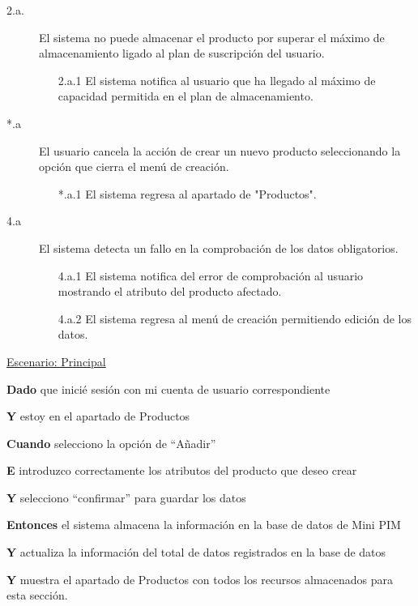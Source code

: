 \begin{description}
    \item[2.a.] El sistema no puede almacenar el producto por superar el máximo de almacenamiento ligado al plan de suscripción del usuario.
    \begin{enumerate}
        \item[2.a.1] El sistema notifica al usuario que ha llegado al máximo de capacidad permitida en el plan de almacenamiento.
    \end{enumerate}

    \item[*.a] El usuario cancela la acción de crear un nuevo producto seleccionando la opción que cierra el menú de creación.
    \begin{enumerate}
        \item[*.a.1] El sistema regresa al apartado de "Productos".
    \end{enumerate}

    \item[4.a] El sistema detecta un fallo en la comprobación de los datos obligatorios.
    \begin{enumerate}
        \item[4.a.1] El sistema notifica del error de comprobación al usuario mostrando el atributo del producto afectado.
        \item[4.a.2] El sistema regresa al menú de creación permitiendo edición de los datos.
    \end{enumerate}
\end{description}

\underline{Escenario: Principal}\par
\vspace{0.15cm}
\textbf{Dado} que inicié sesión con mi cuenta de usuario correspondiente\par
\textbf{Y} estoy en el apartado de Productos\par
\textbf{Cuando} selecciono la opción de “Añadir”\par
\textbf{E} introduzco correctamente los atributos del producto que deseo crear\par
\textbf{Y} selecciono “confirmar” para guardar los datos\par
\textbf{Entonces} el sistema almacena la información en la base de datos de Mini PIM\par
\textbf{Y} actualiza la información del total de datos registrados en la base de datos\par
\textbf{Y} muestra el apartado de Productos con todos los recursos almacenados para esta sección.\par
\vspace{0.20cm}

